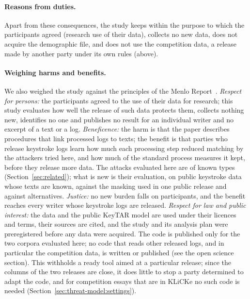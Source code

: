 \begin{ethics}
\paragraph{Reasons from duties.}
Apart from these consequences, the study keeps within the purpose to which the participants agreed (research use of
their data), collects no new data, does not acquire the demographic file, and does not use the competition data, a
release made by another party under its own rules (above).

\paragraph{Weighing harms and benefits.}
We also weighed the study against the principles of the Menlo Report~\cite{dittrich2012menlo}. \emph{Respect for
persons:} the participants agreed to the use of their data for research; this study evaluates how well the release of
such data protects them, collects nothing new, identifies no one and publishes no result for an individual writer and no excerpt of a text or a log. \emph{Beneficence:} the harm is that the paper describes procedures that link processed
logs to texts; the benefit is that parties who release keystroke logs learn how much each processing step reduced
matching by the attackers tried here, and how much of the standard process measures it kept, before they release more
data. The attacks evaluated here are of known types (Section~\ref{sec:related}); what is new is their evaluation, on
public keystroke data whose texts are known, against the masking used in one public release and against alternatives.
\emph{Justice:} no new burden falls on participants, and the benefit reaches every writer whose keystroke logs are
released. \emph{Respect for law and public interest:} the data and the public KeyTAR model are used under their
licences and terms, their sources are cited, and the study and its analysis plan were preregistered before any data
were acquired. The code is published only for the two corpora evaluated here; no code that reads
other released logs, and in particular the competition data, is written or published (see the open science section).
This withholds a ready tool aimed at a particular release; since the columns of the two releases are close, it does
little to stop a party determined to adapt the code, and for competition essays that are in KLiCKe no such code is
needed (Section~\ref{sec:threat-model:settings}).


\end{ethics}

